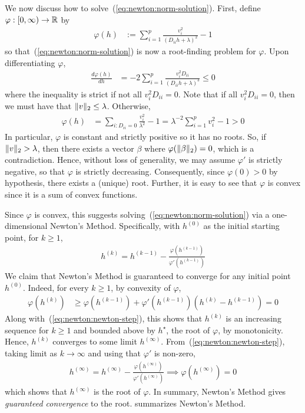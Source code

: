 We now discuss how to solve~(\ref{eq:newton:norm-solution}).
First, define $\varphi : [0, \infty) \to \mathbb{R}$ by
\begin{align*}
    \varphi(h)
    &:=
    \sum\limits_{i=1}^p
    \frac{v_i^2}{(D_{ii} h + \lambda)^2}
    - 1
\end{align*}
so that~(\ref{eq:newton:norm-solution}) is now a root-finding problem for $\varphi$.
Upon differentiating $\varphi$,
\begin{align*}
    \frac{d\varphi(h)}{dh}
    &=
    -2 \sum\limits_{i=1}^p
    \frac{v_i^2 D_{ii}}{(D_{ii} h + \lambda)^3}
    \leq
    0
\end{align*}
where the inequality is strict if not all $v_i^2 D_{ii} = 0$.
Note that if all $v_i^2 D_{ii} = 0$, then we must have that $\|v\|_2 \leq \lambda$.
Otherwise,
\begin{align*}
    \varphi(h)
    &=
    \sum\limits_{i : D_{ii} = 0}
    \frac{v_i^2}{\lambda^2}
    - 1
    =
    \lambda^{-2} \sum\limits_{i=1}^p v_i^2 - 1
    > 0
\end{align*}
In particular, $\varphi$ is constant and strictly positive so it has no roots.
So, if $\|v\|_2 > \lambda$, then there exists a vector $\beta$
where $\varphi(\|\beta\|_2) = 0$, which is a contradiction.
Hence, without loss of generality, we may assume $\varphi'$ is strictly negative,
so that $\varphi$ is strictly decreasing.
Consequently, since $\varphi(0) > 0$ by hypothesis, there exists a (unique) root.
Further, it is easy to see that $\varphi$ is convex since it is a 
sum of convex functions.

Since $\varphi$ is convex, this suggests solving~(\ref{eq:newton:norm-solution})
via a one-dimensional Newton's Method.
Specifically, with $h^{(0)}$ as the initial starting point, for $k\geq 1$,
\begin{align}
    h^{(k)} = h^{(k-1)} - \frac{\varphi(h^{(k-1)})}{\varphi'(h^{(k-1)})}
    \label{eq:newton:newton-step}
\end{align}
We claim that Newton's Method is guaranteed to converge for any initial point $h^{(0)}$.
Indeed, for every $k\geq 1$, by convexity of $\varphi$,
\begin{align*}
    \varphi(h^{(k)})
    &\geq
    \varphi(h^{(k-1)})
    + \varphi'(h^{(k-1)}) (h^{(k)} - h^{(k-1)})
    =
    0
\end{align*}
Along with~(\ref{eq:newton:newton-step}),
this shows that $h^{(k)}$ is an increasing sequence for $k\geq 1$ 
and bounded above by $h^\star$, the root of $\varphi$, by monotonicity.
Hence, $h^{(k)}$ converges to some limit $h^{(\infty)}$. 
From~(\ref{eq:newton:newton-step}), taking limit as $k\to \infty$ and using that $\varphi'$ is non-zero,
\begin{align*}
    h^{(\infty)} = h^{(\infty)} - \frac{\varphi(h^{(\infty)})}{\varphi'(h^{(\infty)})}
    \implies
    \varphi(h^{(\infty)}) = 0
\end{align*}
which shows that $h^{(\infty)}$ is the root of $\varphi$.
In summary, Newton's Method gives \emph{guaranteed convergence} to the root.
 summarizes Newton's Method.

